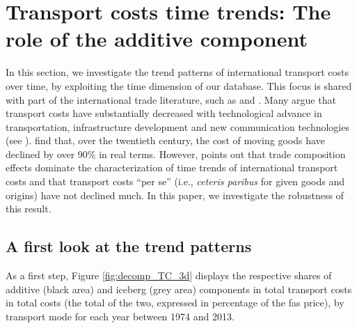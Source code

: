 \documentclass[a4paper,11pt]{article}
\begin{document}
\section{Transport costs time trends: The role of the additive component}\label{sec:results_trends}

In this section, we investigate the trend patterns of international transport costs over time, by exploiting the time dimension of our database. This focus is shared with part of the international trade literature, such as \cite{hummels2007} and \cite{Behar_Venables}. Many argue that transport costs have substantially decreased with technological advance in transportation, infrastructure development and new communication technologies (see \citealp{Lafourcade_Thisse}). \cite{Glaeser04} find that, over the twentieth century, the cost of moving goods have declined by over 90\% in real terms. However, \cite{hummels2007} points out that trade composition effects dominate the characterization of time trends of international transport costs and that transport costs ``per se'' (i.e., \textit{ceteris paribus} for given goods and origins) have not declined much. In this paper, we investigate the robustness of this result.

\subsection{A first look at the trend patterns}

As a first step, Figure \ref{fig:decomp_TC_3d} displays the respective shares of additive (black area) and iceberg (grey area) components in total transport costs in total costs (the total of the two, expressed in percentage of the fas price), by transport mode for each year between 1974 and 2013.
\end{document}
